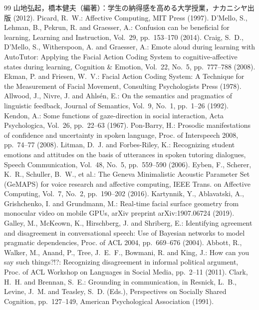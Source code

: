 \documentclass[Japanese]{dicomopapers}
\begin{document}
\begin{thebibliography}{99}
山地弘起，橋本健夫（編著）：学生の納得感を高める大学授業，ナカニシヤ出版 (2012).
Picard, R.~W.: Affective Computing, MIT Press (1997).
D'Mello, S., Lehman, B., Pekrun, R. and Graesser, A.: Confusion can be beneficial for learning, Learning and Instruction, Vol.~29, pp.~153--170 (2014).
Craig, S.~D., D'Mello, S., Witherspoon, A. and Graesser, A.: Emote aloud during learning with AutoTutor: Applying the Facial Action Coding System to cognitive-affective states during learning, Cognition \& Emotion, Vol.~22, No.~5, pp.~777--788 (2008).
Ekman, P. and Friesen, W.~V.: Facial Action Coding System: A Technique for the Measurement of Facial Movement, Consulting Psychologists Press (1978).
Allwood, J., Nivre, J. and Ahls\'{e}n, E.: On the semantics and pragmatics of linguistic feedback, Journal of Semantics, Vol.~9, No.~1, pp.~1--26 (1992).
Kendon, A.: Some functions of gaze-direction in social interaction, Acta Psychologica, Vol.~26, pp.~22--63 (1967).
Pon-Barry, H.: Prosodic manifestations of confidence and uncertainty in spoken language, Proc. of Interspeech 2008, pp.~74--77 (2008).
Litman, D.~J. and Forbes-Riley, K.: Recognizing student emotions and attitudes on the basis of utterances in spoken tutoring dialogues, Speech Communication, Vol.~48, No.~5, pp.~559--590 (2006).
Eyben, F., Scherer, K.~R., Schuller, B.~W., et al.: The Geneva Minimalistic Acoustic Parameter Set (GeMAPS) for voice research and affective computing, IEEE Trans. on Affective Computing, Vol.~7, No.~2, pp.~190--202 (2016).
Kartynnik, Y., Ablavatski, A., Grishchenko, I. and Grundmann, M.: Real-time facial surface geometry from monocular video on mobile GPUs, arXiv preprint arXiv:1907.06724 (2019).
Galley, M., McKeown, K., Hirschberg, J. and Shriberg, E.: Identifying agreement and disagreement in conversational speech: Use of Bayesian networks to model pragmatic dependencies, Proc. of ACL 2004, pp.~669--676 (2004).
Abbott, R., Walker, M., Anand, P., Tree, J.~E.~F., Bowmani, R. and King, J.: How can you say such things?!?: Recognizing disagreement in informal political argument, Proc. of ACL Workshop on Languages in Social Media, pp.~2--11 (2011).
Clark, H.~H. and Brennan, S.~E.: Grounding in communication, in Resnick, L.~B., Levine, J.~M. and Teasley, S.~D. (Eds.), Perspectives on Socially Shared Cognition, pp.~127--149, American Psychological Association (1991).

\end{thebibliography}
\end{document}
